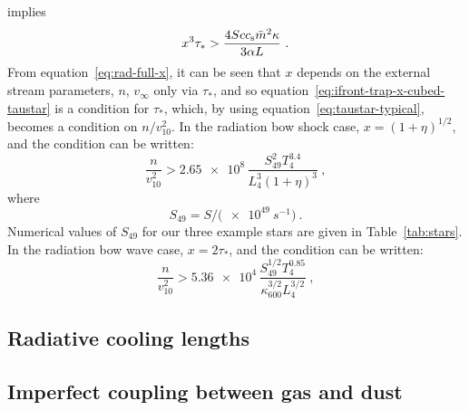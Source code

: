 implies
\begin{equation}
  \label{eq:ifront-trap-x-cubed-taustar}
  x^3 \tau_* > \frac{4 S c \sound \bar{m}^2 \kappa}{3 \alpha L} \ .
\end{equation}
From equation~\eqref{eq:rad-full-x}, it can be seen that \(x\) depends
on the external stream parameters, \(n\), \(v_\infty\) only via
\(\tau_*\), and so equation~\eqref{eq:ifront-trap-x-cubed-taustar} is a
condition for \(\tau_*\), which, by using equation~\eqref{eq:taustar-typical}, becomes a condition on \(n / v_{10}^2\).  In the radiation bow shock case,
\(x = (1 + \eta)^{1/2}\), and the condition can be written:
\begin{equation}
  \label{eq:ifront-trap-density-RBS}
  \frac{n}{v_{10}^2} > \num{2.65e8} \, \frac{S_{49}^2 T_4^{3.4}}{L_4^3 (1 + \eta)^3} \ , 
\end{equation}
where
\begin{equation*}
  S_{49} = S / \bigl( \SI{e49}{s^{-1}} \bigr) \ .
\end{equation*}
Numerical values of \(S_{49}\) for our three example stars are given
in Table~\ref{tab:stars}.  In the radiation bow wave case,
\(x = 2\tau_*\), and the condition can be written:
\begin{equation}
  \label{eq:ifront-trap-taustar-bow-shock}
  \frac{n}{v_{10}^2} > \num{5.36e4} \, \frac{S_{49}^{1/2} T_4^{0.85} }{\kappa_{600}^{3/2} L_4^{3/2}} \ , 
\end{equation}




\subsection{Radiative cooling lengths}
\label{sec:radi-cool-lengths}


\subsection{Imperfect coupling between gas and dust}
\label{sec:imperf-coupl-betw}

